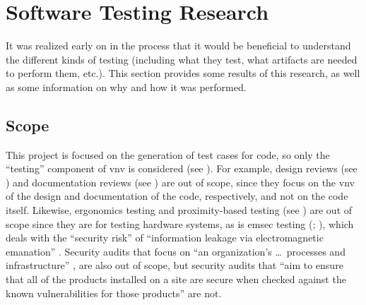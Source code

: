 \newcommand{\procLevel}[1]{``Test level'' can also refer to the scope
of a test process; for example, ``across the whole organization'' or only
``to specific projects'' #1[p.~24]{IEEE2022}}
\newcommand{\phaseDef}{can also refer to the ``period of time in the software
      life cycle'' when testing occurs \citeyearpar[p.~470]{IEEE2017}, usually
      after the implementation phase (\citeyear[pp.~420,~509]{IEEE2017};
      \citealp[p.~56]{Perry2006}).}

\newcommand{\distinctIEEE}[1]{distinct from the notion of ``test #1'' described
      in \nameref{tab:ieeeTestTerms}.}
\newcommand{\notDefDistinctIEEE}[1]{\footnote{Not formally defined, but
            \distinctIEEE{#1}}}
\newcommand{\gerrardDistinctIEEE}[1]{\footnote{``Each type of test addresses a
            different risk area'' \citep[p.~12]{Gerrard2000a}, which is
            \distinctIEEE{#1}}}

\chapter{Software Testing Research}
\label{chap:testing}

It was realized early on in the process that it would be beneficial to
understand the different kinds of testing (including what they test, what
artifacts are needed to perform them, etc.). This section provides some results
of this research, as well as some information on why and how it was performed.

\section{Scope}
\label{chap:testing:sec:scope}

\newcommand{\accelTolTest}{astronauts \citep[p.~11]{MorgunEtAl1999}, aviators
      \citep[pp.~27,~42]{HoweAndJohnson1995}, or catalysts
      \citep[p.~1463]{LiuEtAl2023}}

This project is focused on the generation of test cases for code, so only
the ``testing'' component of \acf{vnv} is considered (see ).
For example, design reviews (see \citealp[p.~132]{IEEE2017}) and
documentation reviews (see \citealp[p.~144]{IEEE2017}) are out of scope,
since they focus on the \acs{vnv} of the design and documentation of the code,
respectively, and not on the code itself. Likewise, ergonomics testing
and proximity-based testing (see ) are out of scope since
they are for testing hardware systems, as is \acf{emsec} testing
(\citealp{ISO2021}; \citealp[p.~95]{ZhouEtAl2012}), which deals with the
``security risk'' of ``information leakage via electromagnetic emanation''
\citep[p.~95]{ZhouEtAl2012}. Security audits that focus on ``an organization's
\dots\ processes and infrastructure'' , are also out of scope,
but security audits that ``aim to ensure that all of the products installed on
a site are secure when checked against the known vulnerabilities for those
products'' \citep[p.~28]{Gerrard2000b} are not.

